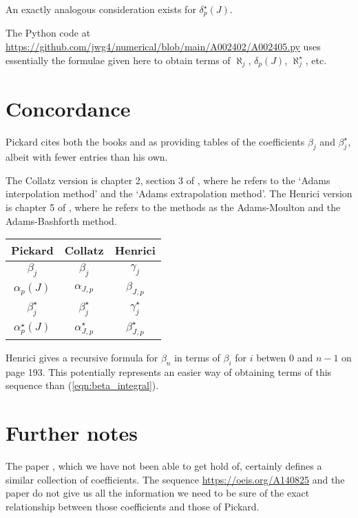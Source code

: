 \documentclass{article}
\begin{document}
An exactly analogous consideration exists for $\delta^{\star}_p(J)$.

The Python code at \url{https://github.com/jwg4/numerical/blob/main/A002402/A002405.py} uses essentially the formulae given here to obtain terms of $\aleph_j$, $\delta_p(J)$, $\aleph^{\star}_j$, etc.

\section{Concordance}
Pickard cites both the books \cite{collatz} and \cite{henrici} as providing tables of the coefficients $\beta_j$ and $\beta^{\star}_j$, albeit with fewer entries than his own.

The Collatz version is chapter 2, section 3 of \cite{collatz}, where he refers to the `Adams interpolation method' and the `Adams extrapolation method'. The Henrici version is chapter 5 of \cite{henrici}, where he refers to the methods as the Adams-Moulton and the Adams-Bashforth method.

\begin{center}
\begin{tabular}{|c|c|c|}
\hline
Pickard \cite{pickard} & Collatz \cite{collatz} & Henrici \cite{henrici} \\ 
\hline
$\beta_j$ & $\beta_j$ & $\gamma_j$ \\
$\alpha_p(J)$ & $\alpha_{J, p}$ & $\beta_{J, p}$ \\
$\beta^{\star}_j$ & $\beta_j^{\star}$ & $\gamma^{\star}_j$ \\
$\alpha^{\star}_p(J)$ & $\alpha^{\star}_{J, p}$ & $\beta^{\star}_{J, p}$ \\
\hline
\end{tabular}
\end{center}

Henrici gives a recursive formula for $\beta_n$ in terms of $\beta_i$ for $i$ betwen $0$ and $n-1$ on page 193. This potentially represents an easier way of obtaining terms of this sequence than (\ref{eqn:beta_integral}).

\section{Further notes}
The paper \cite{curtz}, which we have not been able to get hold of, certainly defines a similar collection of coefficients. The sequence \url{https://oeis.org/A140825} and the paper \cite{flajolet} do not give us all the information we need to be sure of the exact relationship between those coefficients and those of Pickard.




\end{document}

